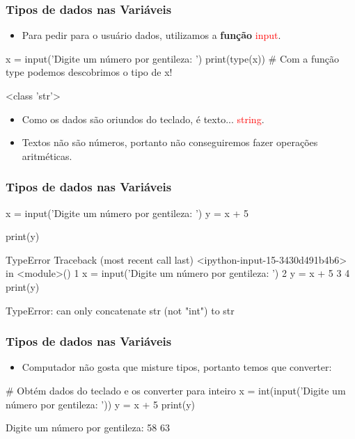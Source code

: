 \documentclass{beamer}
\begin{document}
\begin{frame}[fragile]
  \frametitle{Tipos de dados nas Variáveis}

  \begin{itemize}
    \vfill\item  Para pedir para o usuário dados, utilizamos a \textbf{função} \textcolor{red}{input}.
  \end{itemize}

\vfill \begin{python}
x = input('Digite um número por gentileza: ')
print(type(x))    # Com a função type podemos descobrimos o tipo de x!
\end{python}  

\vfill \begin{python}
<class 'str'>
\end{python}  

  
\begin{itemize}
  \vfill \item Como os dados são oriundos do teclado, é texto... \textcolor{red}{string}.
  \vfill \item Textos não são números, portanto não conseguiremos fazer operações aritméticas.
\end{itemize}
\end{frame}



\begin{frame}[fragile]
  \frametitle{Tipos de dados nas Variáveis}

\vfill \begin{python}
x = input('Digite um número por gentileza: ')
y = x + 5

print(y)
\end{python}  

\vfill \begin{python}
TypeError               Traceback (most recent call last)
<ipython-input-15-3430d491b4b6> in <module>()
      1 x = input('Digite um número por gentileza: ')
      2 y = x + 5
      3 
      4 print(y)

TypeError: can only concatenate str (not "int") to str
\end{python}  
\end{frame}



\begin{frame}[fragile]
  \frametitle{Tipos de dados nas Variáveis}

  \begin{itemize}
    \vfill \item Computador não gosta que misture tipos, portanto temos que converter:
  \end{itemize}

\vfill \begin{python}
# Obtém dados do teclado e os converter para inteiro 
x = int(input('Digite um número por gentileza: '))  
y = x + 5
print(y)
\end{python}  

\vfill \begin{python}
Digite um número por gentileza: 58
63
\end{python} 

\end{frame}
\end{document}
